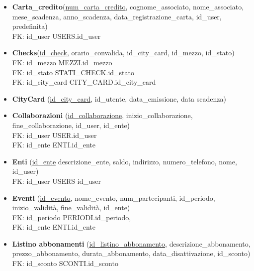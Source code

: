 \begin{itemize}
    \item 
    \textbf{Carta{\_}credito}(\underline{num{\_}carta{\_}credito}, cognome{\_}associato, nome{\_}associato,
    mese{\_}scadenza, anno{\_}scadenza, data{\_}registrazione{\_}carta, id{\_}user,
    predefinita)\\
    FK: id{\_}user \textrightarrow USERS.id{\_}user

    \item 
    \textbf{Checks}(\underline{id{\_}check}, 
    orario{\_}convalida,
    id{\_}city{\_}card,
    id{\_}mezzo,
    id{\_}stato)\\
    FK: id{\_}mezzo \textrightarrow MEZZI.id{\_}mezzo\\
    FK: id{\_}stato \textrightarrow STATI{\_}CHECK.id{\_}stato\\
    FK: id{\_}city{\_}card \textrightarrow CITY{\_}CARD.id{\_}city{\_}card\\

    \item 
    \textbf{CityCard}
    (\underline{id{\_}city{\_}card},
    id{\_}utente,
    data{\_}emissione,
    data scadenza)

    \item 
    \textbf{Collaborazioni}
    (\underline{id{\_}collaborazione},
    inizio{\_}collaborazione,
    fine{\_}collaborazione,
    id{\_}user,
    id{\_}ente)\\
    FK: id{\_}user \textrightarrow USER.id{\_}user\\
    FK: id{\_}ente \textrightarrow ENTI.id{\_}ente

    \item
    \textbf{Enti}
    (\underline{id{\_}ente}
    descrizione{\_}ente,
    saldo,
    indirizzo,
    numero{\_}telefono,
    nome,
    id{\_}user)\\
    FK: id{\_}user \textrightarrow USERS id{\_}user
    
    \item 
    \textbf{Eventi}
    (\underline{id{\_}evento},
    nome{\_}evento,
    num{\_}partecipanti,
    id{\_}periodo,
    inizio{\_}validità,
    fine{\_}validità,
    id{\_}ente)\\
    FK: id{\_}periodo \textrightarrow PERIODI.id{\_}periodo,\\
    FK: id{\_}ente \textrightarrow ENTI.id{\_}ente
    
    \item 
    \textbf{Listino abbonamenti}
    (\underline{id{\_}listino{\_}abbonamento},
    descrizione{\_}abbonamento,
    prezzo{\_}abbonamento,
    durata{\_}abbonamento,
    data{\_}disattivazione,
    id{\_}sconto)\\
    FK: id{\_}sconto \textrightarrow SCONTI.id{\_}sconto
    

\end{itemize}
